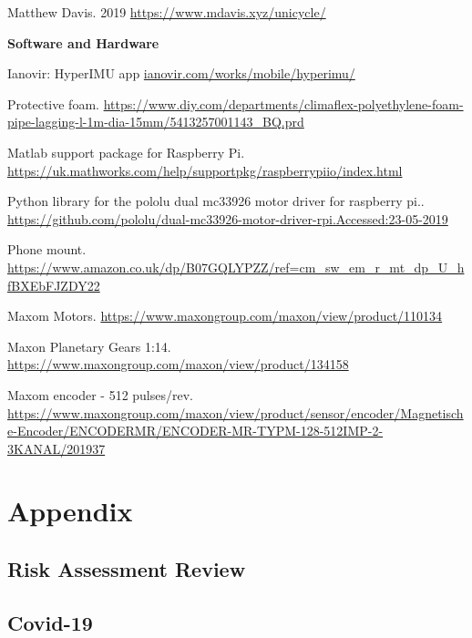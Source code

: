 \documentclass[twoside,twocolumn,12pt]{article}
\begin{document}
\begin{thebibliography}{56}
Matthew Davis. 2019 \url{https://www.mdavis.xyz/unicycle/}



\phantom{please be invisible}
\centerline{\bfseries Software and Hardware} 

Ianovir: HyperIMU app 
\url{ianovir.com/works/mobile/hyperimu/}

Protective foam. \url{https://www.diy.com/departments/climaflex-polyethylene-foam-pipe-lagging-l-1m-dia-15mm/5413257001143_BQ.prd}

Matlab support package for Raspberry Pi. \url{https://uk.mathworks.com/help/supportpkg/raspberrypiio/index.html}

Python library for the pololu dual mc33926 motor driver for raspberry pi.. \url{https://github.com/pololu/dual-mc33926-motor-driver-rpi.Accessed:23-05-2019}

Phone mount. \url{https://www.amazon.co.uk/dp/B07GQLYPZZ/ref=cm_sw_em_r_mt_dp_U_hfBXEbFJZDY22}

Maxom Motors. \url{https://www.maxongroup.com/maxon/view/product/110134}

Maxon Planetary Gears 1:14. \url{https://www.maxongroup.com/maxon/view/product/134158}

Maxom encoder - 512 pulses/rev. \url{https://www.maxongroup.com/maxon/view/product/sensor/encoder/Magnetische-Encoder/ENCODERMR/ENCODER-MR-TYPM-128-512IMP-2-3KANAL/201937}

\end{thebibliography}



\clearpage
\section{Appendix}
\subsection{Risk Assessment Review}

\clearpage
\subsection{Covid-19}




\end{document}
